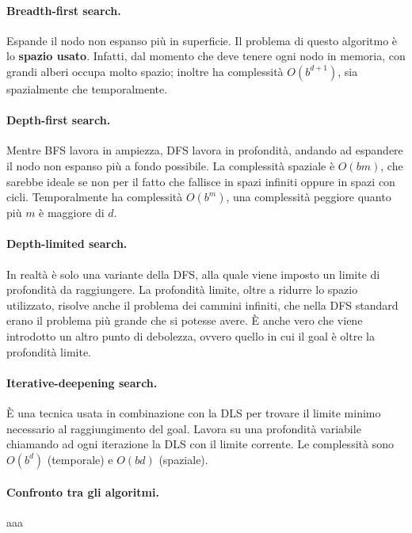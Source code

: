 \documentclass[a4paper, 11pt]{article}
\begin{document}
\paragraph{Breadth-first search.} Espande il nodo non espanso più in superficie. Il problema di questo algoritmo è lo \textbf{spazio usato}. Infatti, dal momento che deve tenere ogni nodo in memoria, con grandi alberi occupa molto spazio; inoltre ha complessità $O(b^{d+1})$, sia spazialmente che temporalmente.

\paragraph{Depth-first search.} Mentre BFS lavora in ampiezza, DFS lavora in profondità, andando ad espandere il nodo non espanso più a fondo possibile. La complessità spaziale è $O(bm)$, che sarebbe ideale se non per il fatto che fallisce in spazi infiniti oppure in spazi con cicli. Temporalmente ha complessità $O(b^m)$, una complessità peggiore quanto più $m$ è maggiore di $d$.

\paragraph{Depth-limited search.} In realtà è solo una variante della DFS, alla quale viene imposto un limite di profondità da raggiungere. La profondità limite, oltre a ridurre lo spazio utilizzato, risolve anche il problema dei cammini infiniti, che nella DFS standard erano il problema più grande che si potesse avere. È anche vero che viene introdotto un altro punto di debolezza, ovvero quello in cui il goal è oltre la profondità limite.

\paragraph{Iterative-deepening search.} È una tecnica usata in combinazione con la DLS per trovare il limite minimo necessario al raggiungimento del goal. Lavora su una profondità variabile chiamando ad ogni iterazione la DLS con il limite corrente. Le complessità sono $O(b^d)$ (temporale) e $O(bd)$ (spaziale).

\paragraph{Confronto tra gli algoritmi.} aaa
\end{document}
